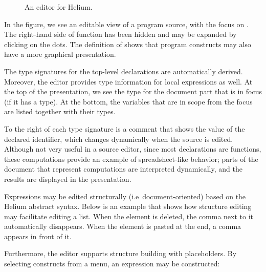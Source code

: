 \begin{figure}
\begin{center}
\caption{An editor for Helium.}\label{heliumMain} 
\end{center}
\end{figure}

In the figure, we see an editable view of a program source, with the focus on . The right-hand side of function  has been hidden and may be expanded by clicking on the dots. The definition of  shows that program constructs may also have a more graphical presentation.

The type signatures for the top-level declarations are automatically derived.  Moreover, the editor provides type information for local expressions as well. At the top of the presentation, we see the type for the document part that is in focus (if it has a type). At the bottom, the variables that are in scope from the focus are listed together with their types.

To the right of each type signature is a comment that shows the value of the declared identifier, which changes dynamically when the source is edited. Although not very useful in a source editor, since most declarations are functions, these computations provide an example of spreadsheet-like behavior; parts of the document that represent computations are interpreted dynamically, and the results are displayed in the presentation.


Expressions may be edited structurally (i.e\ document-oriented) based on the Helium abstract syntax. Below is an example that shows how structure editing may facilitate editing a list. When the  element is deleted, the comma next to it automatically disappears. When the element is pasted at the end, a comma appears in front of it. 

 
 

Furthermore, the editor supports structure building with placeholders. By selecting constructs from a menu, an expression may be constructed:

